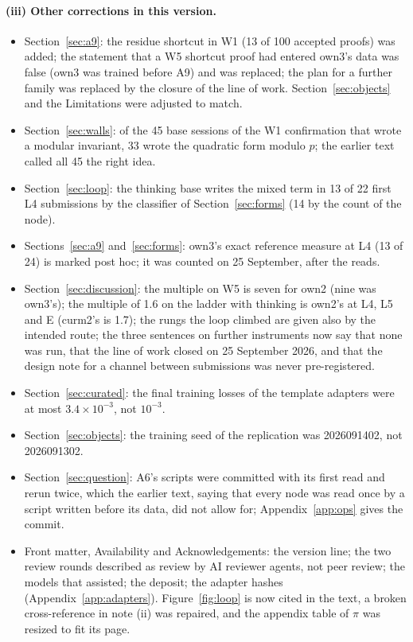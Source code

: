 \documentclass[11pt]{article}
\begin{document}
\paragraph{(iii) Other corrections in this version.}
\begin{itemize}\setlength{\itemsep}{0pt}
\item Section~\ref{sec:a9}: the residue shortcut in W1 (13 of 100 accepted
proofs) was added; the statement that a W5 shortcut proof had entered
own3's data was false (own3 was trained before A9) and was replaced; the
plan for a further family was replaced by the closure of the line of work.
Section~\ref{sec:objects} and the Limitations were adjusted to match.
\item Section~\ref{sec:walls}: of the 45 base sessions of the W1
confirmation that wrote a modular invariant, 33 wrote the quadratic form
modulo $p$; the earlier text called all 45 the right idea.
\item Section~\ref{sec:loop}: the thinking base writes the mixed term in
13 of 22 first L4 submissions by the classifier of Section~\ref{sec:forms}
(14 by the count of the node).
\item Sections~\ref{sec:a9} and~\ref{sec:forms}: own3's exact reference
measure at L4 (13 of 24) is marked post hoc; it was counted on 25
September, after the reads.
\item Section~\ref{sec:discussion}: the multiple on W5 is seven for own2
(nine was own3's); the multiple of 1.6 on the ladder with thinking is
own2's at L4, L5 and E (curm2's is 1.7); the rungs the loop climbed are
given also by the intended route; the three sentences on further
instruments now say that none was run, that the line of work closed on 25
September 2026, and that the design note for a channel between submissions
was never pre-registered.
\item Section~\ref{sec:curated}: the final training losses of the template
adapters were at most $3.4\times10^{-3}$, not $10^{-3}$.
\item Section~\ref{sec:objects}: the training seed of the replication was
2026091402, not 2026091302.
\item Section~\ref{sec:question}: A6's scripts were committed with its
first read and rerun twice, which the earlier text, saying that every node
was read once by a script written before its data, did not allow for;
Appendix~\ref{app:ops} gives the commit.
\item Front matter, Availability and Acknowledgements: the version line;
the two review rounds described as review by AI reviewer agents, not peer
review; the models that assisted; the deposit; the adapter hashes
(Appendix~\ref{app:adapters}). Figure~\ref{fig:loop} is now cited in the
text, a broken cross-reference in note (ii) was repaired, and the
appendix table of $\pi$ was resized to fit its page.
\end{itemize}
\end{document}
